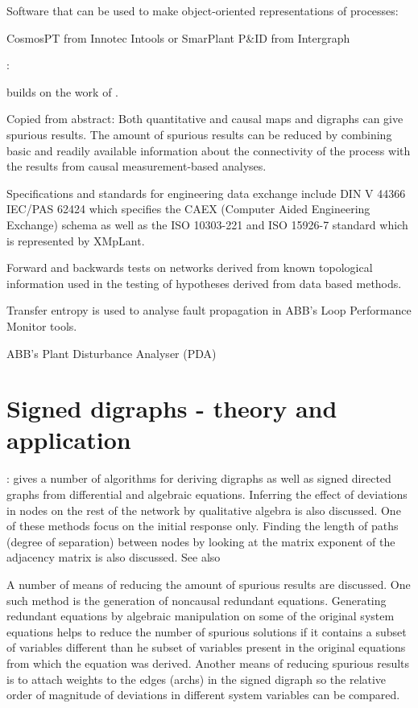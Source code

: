 \documentclass{article}
\begin{document}
Software that can be used to make object-oriented representations of processes:

CosmosPT from Innotec
Intools or SmarPlant P\&ID from Intergraph



\citet{Thambirajah2009}:

\citet{Thambirajah2009} builds on the work of \citet{Yim2006}.

Copied from abstract:
Both quantitative and causal maps and digraphs can give spurious results.
The amount of spurious results can be reduced by combining basic and readily available information about the connectivity of the process with the results from causal measurement-based analyses.

Specifications and standards for engineering data exchange include DIN V 44366 IEC/PAS 62424 which specifies the CAEX (Computer Aided Engineering Exchange) schema as well as the ISO 10303-221 and ISO 15926-7 standard which is represented by XMpLant.

Forward and backwards tests on networks derived from known topological information used in the testing of hypotheses derived from data based methods.

Transfer entropy is used to analyse fault propagation in ABB's Loop Performance Monitor tools.

ABB's Plant Disturbance Analyser (PDA)



\section{Signed digraphs - theory and application}


\citet{Mauraya2003a}
\citet{Mauraya2003b}:
\citet{Mauraya2003b} gives a number of algorithms for deriving digraphs as well as signed directed graphs from differential and algebraic equations.
Inferring the effect of deviations in nodes on the rest of the network by qualitative algebra is also discussed.
One of these methods focus on the initial response only.
Finding the length of paths (degree of separation) between nodes by looking at the matrix exponent of the adjacency matrix is also discussed.
See also \citet{Jiang2009}

A number of means of reducing the amount of spurious results are discussed.
One such method is the generation of noncausal redundant equations.
Generating redundant equations by algebraic manipulation on some of the original system equations helps to reduce the number of spurious solutions if it contains a subset of variables different than he subset of variables present in the original equations from which the equation was derived.
Another means of reducing spurious results is to attach weights to the edges (archs) in the signed digraph so the relative order of magnitude of deviations in different system variables can be compared.
\end{document}
